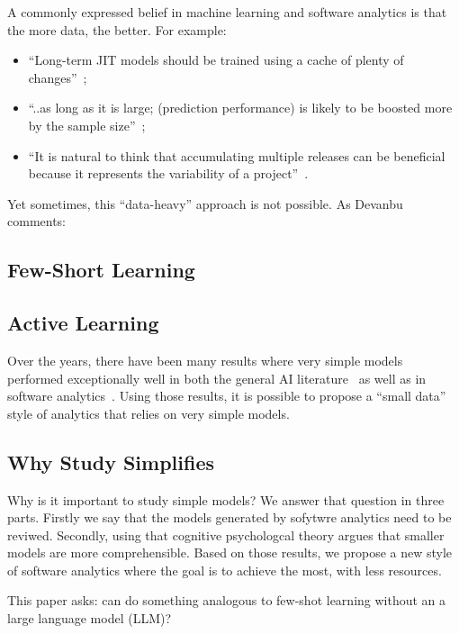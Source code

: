 A commonly expressed belief in machine learning and software analytics
is that the more data, the better.  For example:  
\begin{itemize}
\item
  ``Long-term JIT models should be trained using a cache of
plenty of changes''~\cite{mcintosh2017fix};
\item
  ``..as long as it is large;    (prediction performance) is likely to be boosted more by the sample size''~\cite{rahman2013sample};
  \item
``It is 
natural to think that accumulating multiple releases can be beneficial because
it represents the variability of a project''~\cite{amasaki2020cross}. 
\end{itemize}
Yet sometimes, this ``data-heavy'' approach is not possible. As Devanbu comments: 


\subsection{Few-Short Learning}

\subsection{Active Learning}

Over the years, there have been many results
where   very simple models performed exceptionally well
in both the general AI literature~\cite{Holte1993VerySC,Kohavi97} as
well as in software analytics~\cite{agrawal2019dodge,menzies2008implications}.
Using those results,  it is possible to propose a ``small data''
style of analytics that relies on very simple models.  

\subsection{Why Study Simplifies}
Why is it important to study simple models?  We answer that question in three parts.
Firstly we say that the models generated by sofytwre analytics need to be reviwed.
Secondly, using that cognitive psychologcal theory argues that smaller models are more comprehensible.  
Based on those results, we propose a new style of software analytics
where the goal is to achieve the most, with less resources.  




This paper asks: can do something analogous to  few-shot learning without an a large language model (LLM)?

